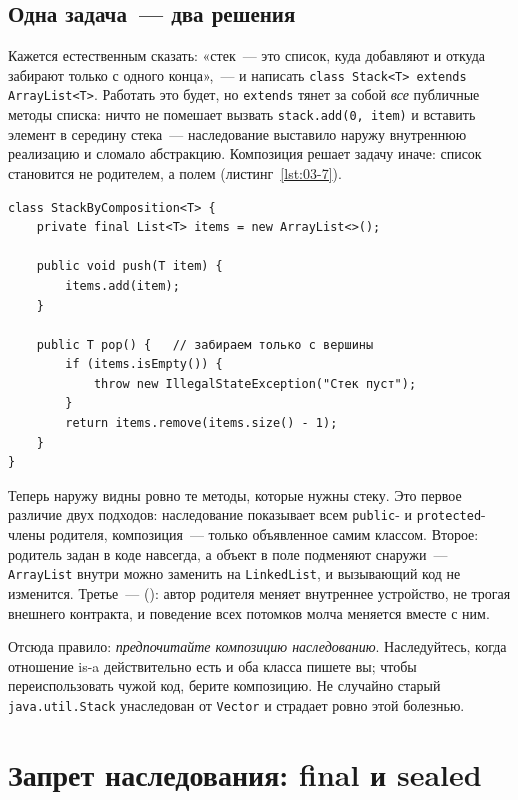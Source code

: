 \subsection{Одна задача~--- два решения}

Кажется естественным сказать: «стек~--- это список, куда добавляют и откуда
забирают только с одного конца»,~--- и написать
\texttt{class Stack<T> extends ArrayList<T>}. Работать это будет, но
\texttt{extends} тянет за собой \emph{все} публичные методы списка: ничто не
помешает вызвать \texttt{stack.add(0, item)} и вставить элемент в середину
стека~--- наследование выставило наружу внутреннюю реализацию и сломало
абстракцию. Композиция решает задачу иначе: список становится не родителем, а
полем (листинг~\ref{lst:03-7}).

\begin{listing}[H]
\begin{verbatim}
class StackByComposition<T> {
    private final List<T> items = new ArrayList<>();

    public void push(T item) {
        items.add(item);
    }

    public T pop() {   // забираем только с вершины
        if (items.isEmpty()) {
            throw new IllegalStateException("Стек пуст");
        }
        return items.remove(items.size() - 1);
    }
}
\end{verbatim}
\caption{Стек, построенный на композиции}
\label{lst:03-7}
\end{listing}

Теперь наружу видны ровно те методы, которые нужны стеку. Это первое различие
двух подходов: наследование показывает всем \texttt{public}- и
\texttt{protected}-члены родителя, композиция~--- только объявленное самим
классом. Второе: родитель задан в коде навсегда, а объект в поле подменяют
снаружи~--- \texttt{ArrayList} внутри можно заменить на \texttt{LinkedList}, и
вызывающий код не изменится. Третье~--- 
(): автор родителя меняет внутреннее
устройство, не трогая внешнего контракта, и поведение всех потомков молча
меняется вместе с ним.

Отсюда правило: \emph{предпочитайте композицию наследованию}. Наследуйтесь,
когда отношение is-a действительно есть и оба класса пишете вы; чтобы
переиспользовать чужой код, берите композицию. Не случайно старый
\texttt{java.util.Stack} унаследован от \texttt{Vector} и страдает ровно этой
болезнью.

\section{Запрет наследования: final и sealed}

